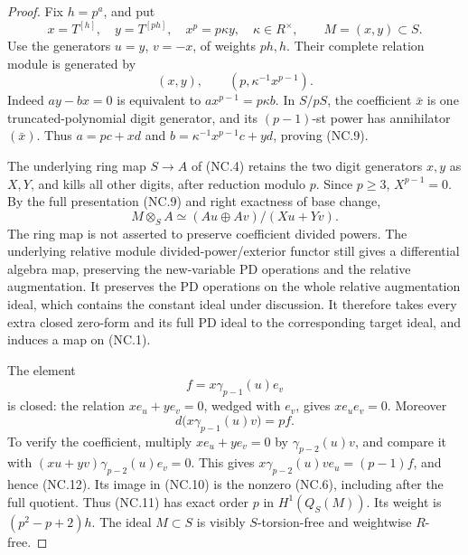 \begin{proof}
Fix \(h=p^a\), and put
\[
 x=T^{[h]},\quad y=T^{[ph]},\quad
 x^p=p\kappa y,\quad\kappa\in R^\times,
 \qquad M=(x,y)\subset S.
\]
Use the generators \(u=y\), \(v=-x\), of weights \(ph,h\).
Their complete relation module is generated by
\[
              (x,y),\qquad (p,\kappa^{-1}x^{p-1}).       \tag{NC.9}
\]
Indeed \(a y-bx=0\) is equivalent to
\(a x^{p-1}=p\kappa b\).  In \(S/pS\), the coefficient
\(\bar x\) is one truncated-polynomial digit generator,
and its \((p-1)\)-st power has annihilator \((\bar x)\).
Thus \(a=pc+xd\) and
\(b=\kappa^{-1}x^{p-1}c+yd\), proving (NC.9).

The underlying ring map \(S\to A\) of (NC.4) retains the two
digit generators \(x,y\) as \(X,Y\), and kills all other
digits, after reduction modulo \(p\).  Since \(p\geq3\),
\(X^{p-1}=0\).  By the full presentation (NC.9) and right
exactness of base change,
\[
                 M\otimes_S A\simeq(Au\oplus Av)/(Xu+Yv).
                                                               \tag{NC.10}
\]
The ring map is not asserted to preserve coefficient divided
powers.  The underlying relative module divided-power/exterior
functor still gives a differential algebra map, preserving the
new-variable PD operations and the relative augmentation.
It preserves the PD operations on the whole relative augmentation
ideal, which contains the constant ideal under discussion.  It
therefore takes every extra closed zero-form and its full PD ideal
to the corresponding target ideal, and induces a map on (NC.1).

The element
\[
             f=x\gamma_{p-1}(u)e_v                     \tag{NC.11}
\]
is closed: the relation \(xe_u+ye_v=0\), wedged with
\(e_v\), gives \(xe_ue_v=0\).  Moreover
\[
                 d\bigl(x\gamma_{p-1}(u)v\bigr)=pf.    \tag{NC.12}
\]
To verify the coefficient, multiply \(xe_u+ye_v=0\) by
\(\gamma_{p-2}(u)v\), and compare it with
\((xu+yv)\gamma_{p-2}(u)e_v=0\).  This gives
\(x\gamma_{p-2}(u)v e_u=(p-1)f\), and hence (NC.12).
Its image in (NC.10) is the nonzero (NC.6), including after
the full quotient.  Thus (NC.11) has exact order \(p\) in
\(H^1(Q_S(M))\).  Its weight is
\((p^2-p+2)h\).  The ideal \(M\subset S\) is visibly
\(S\)-torsion-free and weightwise \(R\)-free.


\end{proof}
